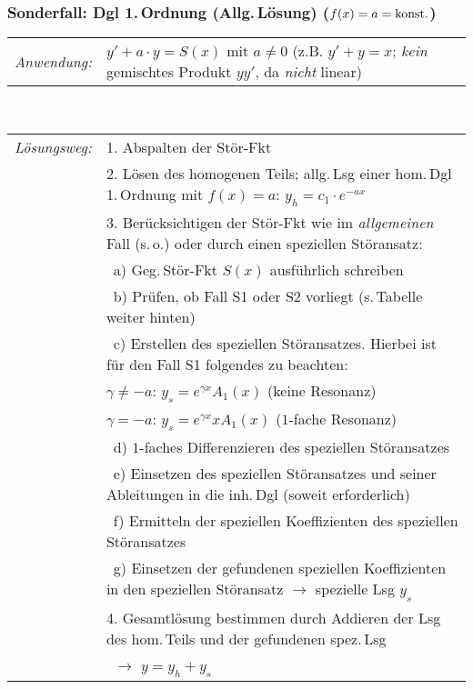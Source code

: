 \documentclass[a4paper,10pt,titlepage]{scrartcl}
\begin{document}
\subsubsection*{Sonderfall: Dgl 1.\,Ordnung (Allg.\,Lösung) ($f(x)=a=\text{{\normalfont konst.}}$)}
\begin{tabular}{ll}
 \emph{Anwendung:}
 & $y'+a\cdot y=S(x)$ \; mit \; $a\neq0$ \qquad (z.B. $y'+y=x$; \emph{kein} gemischtes Produkt $yy'$, da \emph{nicht} linear)\\
\end{tabular}
\smallskip\\
\begin{tabular}{ll}
 \emph{Lösungsweg:}
 & 1. Abspalten der Stör-Fkt\\
 & 2. Lösen des homogenen Teils; allg.\,Lsg einer hom.\,Dgl 1.\,Ordnung mit $f(x)=a$: $y_h=c_1\cdot e^{-ax}$\\
 & 3. Berücksichtigen der Stör-Fkt wie im \emph{allgemeinen} Fall (s.\,o.) oder durch einen speziellen Störansatz:\\
 & \quad\, a) Geg.\,Stör-Fkt $S(x)$ ausführlich schreiben\\
 & \quad\, b) Prüfen, ob Fall S1 oder S2 vorliegt (s.\,Tabelle weiter hinten)\\
 & \quad\, c) Erstellen des speziellen Störansatzes. Hierbei ist für den Fall S1 folgendes zu beachten:\\
 & \qquad\;   $\gamma\neq -a$: \; $y_s=e^{\gamma x} A_1(x)$    \qquad\hspace{1.4mm} (keine Resonanz)\\
 & \qquad\;   $\gamma=-a$:     \; $y_s=e^{\gamma x} x A_1(x)$ \qquad               ($1$-fache Resonanz)\\
 & \quad\, d) $1$-faches Differenzieren des speziellen Störansatzes\\
 & \quad\, e) Einsetzen des speziellen Störansatzes und seiner Ableitungen in die inh.\,Dgl (soweit erforderlich)\\
 & \quad\, f) Ermitteln der speziellen Koeffizienten des speziellen Störansatzes\\ %
 & \quad\, g) Einsetzen der gefundenen speziellen Koeffizienten in den speziellen Störansatz $\to$ spezielle Lsg $y_s$\\
 & 4. Gesamtlösung bestimmen durch Addieren der Lsg des hom.\,Teils und der gefundenen spez.\,Lsg\\
 & \quad\, $\to$ $y=y_h+y_s$\\
\end{tabular}
\end{document}
